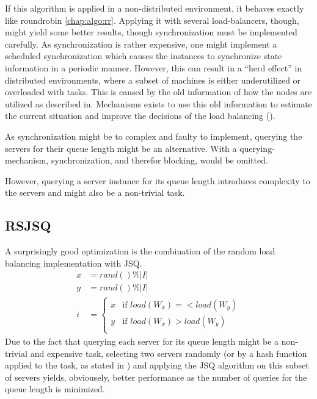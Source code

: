If this algorithm is applied in a non-distributed environment, it behaves
exactly like roundrobin \ref{chap:algo:rr}.
Applying it with several load-balancers, though, might yield some better
results, though synchronization must be implemented carefully.
As synchronization is rather expensive, one might implement a scheduled
synchronization which causes the instances to synchronize state information in a
periodic manner.
However, this can result in a ``herd effect'' in distributed environments,
where a subset of machines is either underutilized or overloaded with tasks.
This is caused by the old information of how the nodes are
utilized as described in.
Mechanisms exists to use this old information to estimate the current situation
and improve the decisions of the load balancing (\cite{inpSLoadInfo}).

As synchronization might be to complex and faulty to implement, querying the
servers for their queue length might be an alternative.
With a querying-mechanism, synchronization, and therefor blocking, would be
omitted.

However, querying a server instance for its queue length introduces complexity
to the servers and might also be a non-trivial task.

\subsection{\ac{RSJSQ}}

A surprisingly good optimization is the combination of the random load balancing
implementation with \ac{JSQ}.
\begin{equation}
    \begin{aligned}
        x &= rand() \% |I| \\
        y &= rand() \% |I| \\
        i &= \begin{cases}
            x & \text{if } load(W_x) =< load(W_y)\\
            y & \text{if } load(W_x) > load(W_y)\\
        \end{cases}
    \end{aligned}
    \label{eq:randjsq}
\end{equation}
Due to the fact that querying each server for its queue length
might be a non-trivial and expensive task,
selecting two servers randomly (or by a hash function applied to the task, as
stated in \cite{powerOfTwoRandomChoices}) and applying the \ac{JSQ} algorithm on
this subset of servers yields, obviousely, better performance as the number of
queries for the queue length is minimized.

